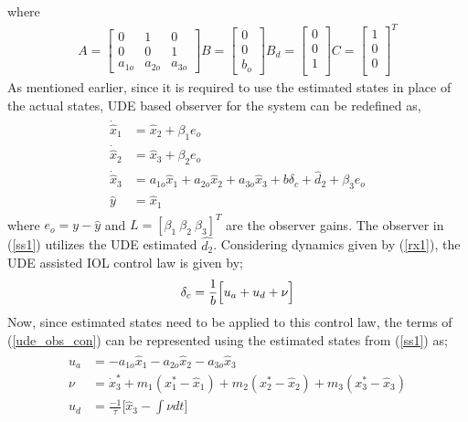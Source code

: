 \documentclass[conference]{IEEEtran}
\begin{document}
		where 
		\begin{eqnarray}
			A = 
			\begin{bmatrix}
				0 & 1 & 0\\
				0 & 0 & 1\\
				a_{1o} & a_{2o} & a_{3o}
			\end{bmatrix}
			B = 
			\begin{bmatrix}
				0 \\
				0 \\
				b_o
			\end{bmatrix}
			B_d = 
			\begin{bmatrix}
				0 \\
				0 \\
				1 \\
			\end{bmatrix} 
			C = 
			\begin{bmatrix}
				1 \\
				0 \\
				0 \\
			\end{bmatrix}^T \nonumber
		\end{eqnarray}
		As mentioned earlier, since it is required to use the estimated states in place of the actual states, UDE based observer for the system can be redefined as,
		\begin{eqnarray}
			\begin{aligned}
				\dot{\hat{x}}_1 &= \hat{x}_2 + \beta_1 e_o\\
				\dot{\hat{x}}_2 &= \hat{x}_3 + \beta_2 e_o\\
				\dot{\hat{x}}_3 &= a_{1o}\hat{x}_1 + a_{2o}\hat{x}_2 + a_{3o}\hat{x}_3 + b \delta_c + \hat{d}_2 + \beta_3 e_o\\		
				\hat{y} &= \hat{x}_1 \label{ss1}
			\end{aligned}
		\end{eqnarray}
		where $e_o = y - \hat{y}$ and $L = [\beta_1\ \beta_2\ \beta_3]^T$ are the observer gains. The observer in (\ref{ss1}) utilizes the UDE estimated $\hat{d_2}$. Considering dynamics given by (\ref{rx1}), the UDE assisted IOL control law is given by;
		\begin{equation}
				\delta_c = \frac{1}{b}\Big[u_a+u_d+\nu\Big] \\ \label{ude_obs_con}
		\end{equation}
		Now, since estimated states need to be applied to this control law, the terms of (\ref{ude_obs_con}) can be represented using the estimated states from (\ref{ss1}) as; 		
		\begin{eqnarray}
			\begin{aligned}
				u_a &= -a_{1o}\hat{x}_1 - a_{2o}\hat{x}_2 - a_{3o}\hat{x}_3 \\
				\nu &= \dot{x}^\ast_3+m_1(x^\ast_1-\hat{x}_1) + m_2(x^\ast_2-\hat{x}_2) + m_3(x^\ast_3-\hat{x}_3) \\
				u_d &= \frac{-1}{\tau}\Big[\hat{x}_3-\int{\nu dt}\Big] \label{ud} \nonumber
			\end{aligned}
		\end{eqnarray}
							
\end{document}
